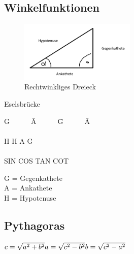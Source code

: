 \documentclass[12pt,a4paper]{article}
\begin{document}
\subsection{Winkelfunktionen}
\begin{figure}
\includegraphics[width=5.5cm]{bild3.png}
\caption{Rechtwinkliges Dreieck}
\end{figure}
Eselsbrücke
\begin{tabbing}
G~~~~~~\= A~~~~~~\= G~~~~~~\= A \\
\>\>\>\\
H\> H\> A\> G \\
\>\>\>\\
SIN\> COS\> TAN\> COT\\
\end{tabbing}
G = Gegenkathete\\
A = Ankathete\\
H = Hypotenuse
\subsection{Pythagoras}
$c=\sqrt{a^2+b^2}\\
a=\sqrt{c^2-b^2}\\
b=\sqrt{c^2-a^2}\\$
\pagebreak
\end{document}
